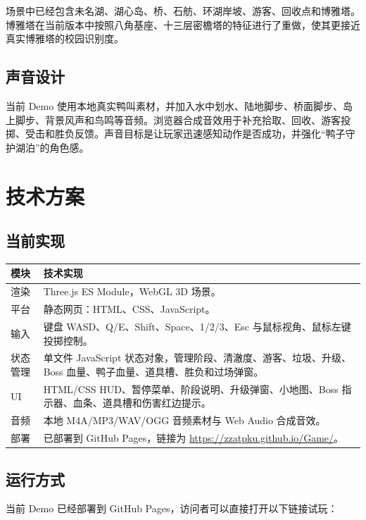 \documentclass[UTF8,a4paper,12pt]{ctexart}
\begin{document}
场景中已经包含未名湖、湖心岛、桥、石舫、环湖岸坡、游客、回收点和博雅塔。博雅塔在当前版本中按照八角基座、十三层密檐塔的特征进行了重做，使其更接近真实博雅塔的校园识别度。

\subsection{声音设计}

当前 Demo 使用本地真实鸭叫素材，并加入水中划水、陆地脚步、桥面脚步、岛上脚步、背景风声和鸟鸣等音频。浏览器合成音效用于补充拾取、回收、游客投掷、受击和胜负反馈。声音目标是让玩家迅速感知动作是否成功，并强化``鸭子守护湖泊''的角色感。

\section{技术方案}

\subsection{当前实现}

\begin{table}[h]
\centering
\begin{tabularx}{\textwidth}{p{3cm}Y}
\toprule
模块 & 技术实现 \\
\midrule
渲染 & Three.js ES Module，WebGL 3D 场景。 \\
平台 & 静态网页：HTML、CSS、JavaScript。 \\
输入 & 键盘 WASD、Q/E、Shift、Space、1/2/3、Esc 与鼠标视角、鼠标左键投掷控制。 \\
状态管理 & 单文件 JavaScript 状态对象，管理阶段、清澈度、游客、垃圾、升级、Boss 血量、鸭子血量、道具槽、胜负和过场弹窗。 \\
UI & HTML/CSS HUD、暂停菜单、阶段说明、升级弹窗、小地图、Boss 指示器、血条、道具槽和伤害红边提示。 \\
音频 & 本地 M4A/MP3/WAV/OGG 音频素材与 Web Audio 合成音效。 \\
部署 & 已部署到 GitHub Pages，链接为 \url{https://zzatpku.github.io/Game/}。 \\
\bottomrule
\end{tabularx}
\end{table}

\subsection{运行方式}

当前 Demo 已经部署到 GitHub Pages，访问者可以直接打开以下链接试玩：
\end{document}
